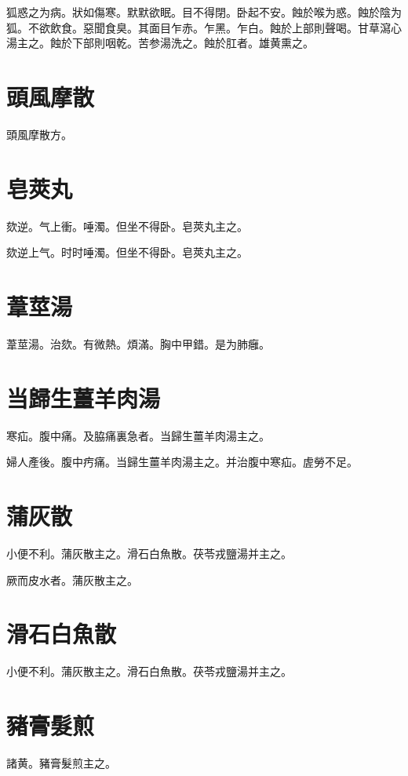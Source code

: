 狐惑之为病。狀如傷寒。默默欲眠。目不得閉。卧起不安。蝕於喉为惑。蝕於陰为狐。不欲飲食。惡聞食臭。其面目乍赤。乍黑。乍白。蝕於上部則聲喝。甘草瀉心湯主之。蝕於下部則咽乾。苦参湯洗之。蝕於肛者。雄黄熏之。

\section{頭風摩散}

頭風摩散方。

\section{皂莢丸}

欬逆。气上衝。唾濁。但坐不得卧。皂莢丸主之。{\wuben}

欬逆上气。时时唾濁。但坐不得卧。皂莢丸主之。{\dengben}

\section{葦莖湯}

葦莖湯。治欬。有微熱。煩滿。胸中甲錯。是为肺癰。

\section{当歸生薑羊肉湯}

寒疝。腹中痛。及脇痛裏急者。当歸生薑羊肉湯主之。

{\khaaitp 婦人}產後。腹中㽲痛。当歸生薑羊肉湯主之。并治腹中寒疝。虗勞不足。

\section{蒲灰散}

小便不利。蒲灰散主之。滑石白魚散。茯苓戎鹽湯并主之。

厥而皮水者。蒲灰散主之。

\section{滑石白魚散}

小便不利。蒲灰散主之。滑石白魚散。茯苓戎鹽湯并主之。

\section{豬膏髮煎}

諸黄。豬膏髮煎主之。

